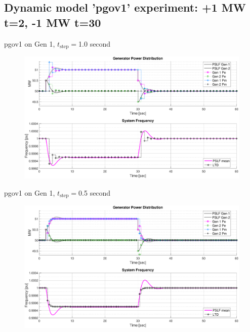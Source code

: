 \documentclass[14pt, unknownkeysallowed]{beamer}
\begin{document}
\subsection{Dynamic model 'pgov1' experiment: +1 MW t=2, -1 MW t=30}
\begin{frame}
pgov1 on Gen 1, $t_\text{step}=$1.0 second
\begin{figure}
	\includegraphics[width=\linewidth]{pgov1TestA}
\end{figure}
\end{frame}
\begin{frame}
pgov1 on Gen 1, $t_\text{step}=$0.5 second
\begin{figure}
\includegraphics[width=\linewidth]{pgov1TestC}
\end{figure}
\end{frame}
\end{document}

